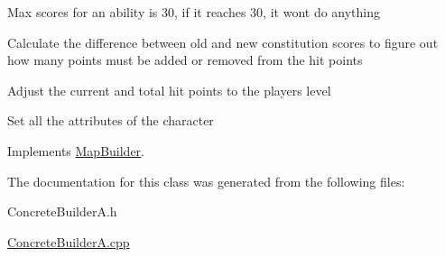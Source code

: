 Max scores for an ability is 30, if it reaches 30, it won\textquotesingle{}t do anything

Calculate the difference between old and new constitution scores to figure out how many points must be added or removed from the hit points

Adjust the current and total hit points to the player\textquotesingle{}s level

Set all the attributes of the character 

Implements \hyperlink{class_map_builder}{Map\+Builder}.



The documentation for this class was generated from the following files\+:\begin{DoxyCompactItemize}
\item 
Concrete\+Builder\+A.\+h\item 
\hyperlink{_concrete_builder_a_8cpp}{Concrete\+Builder\+A.\+cpp}\end{DoxyCompactItemize}

